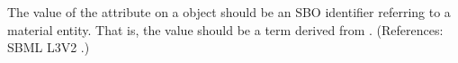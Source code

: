 The value of the attribute  on a \Compartment object should
be an SBO identifier referring to a material entity.  That is, the value
should be a term derived from \sbomaterialentity.  (References: SBML L3V2
.)
